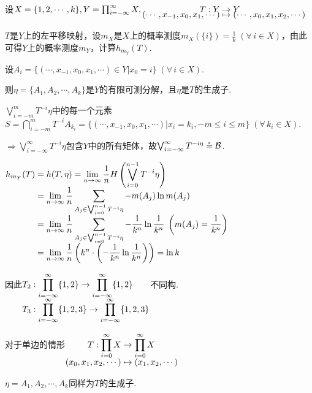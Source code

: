 \begin{instance}
    设$X=\{1,2,\cdots,k\},Y=\prod_{i=-\infty}^{\infty}{X},\setjot[-6]\begin{aligned}[t]
        T:Y&\to Y \\
        (\cdots,x_{-1},x_0,x_1,\cdots) &\mapsto (\cdots,x_0,x_1,x_2,\cdots)
    \end{aligned}$\par
    $T$是$Y$上的左平移映射，设$m_X$是$X$上的概率测度$m_X(\{i\})=\frac{1}{k}\;(\forall\, i\in X)$，由此可得$Y$上的概率测度$m_Y$，计算$h_{m_Y}(T)$.\par
    \begin{solution}
        设$A_i=\{(\cdots,x_{-1},x_0,x_1,\cdots)\in Y|x_0=i\}\;(\forall\, i\in X)$.\par
        则$\eta=\{A_1,A_2,\cdots,A_k\}$是$Y$的有限可测分解，且$\eta$是$T$的生成子.\par
        $\bigvee_{i=-m}^m{T^{-i}\eta}$中的每一个元素$S=\bigcap_{i=-m}^m{T^{-i}A_{k_i}}=\{(\cdots,x_{-1},x_0,x_1,\cdots)|x_i=k_i,-m\leq i\leq m\}\; (\forall\, k_i\in X)$.\par
        $\Rightarrow \bigvee_{i=-\infty}^\infty{T^{-i}\eta}$包含$Y$中的所有矩体，故$\bigvee_{i=-\infty}^\infty{T^{-i\eta}}\circeq\mathcal{B}$.\par
        $\setjot[-2]\begin{aligned}[t]
            h_{m_Y}(T) &= h(T,\eta) =\lim_{n\to\infty}{\frac{1}{n}H \left(\bigvee_{i=0}^{n-1}T^{-i}\eta\right)} \\
            &=\lim_{n\to\infty}{\frac{1}{n}\sum_{A_j\in\bigvee_{i=0}^{n-1}T^{-i}\eta}{-m(A_j)\ln{m(A_j)}}} \\
            &=\lim_{n\to\infty}{\frac{1}{n}\sum_{A_j\in\bigvee_{i=0}^{n-1}T^{-i}\eta}{-\frac{1}{k^n}\ln{\frac{1}{k^n}}}}\; \left(m(A_j)=\frac{1}{k^n}\right) \\
            &=\lim_{n\to\infty}{\frac{1}{n}\left(k^n\cdot \left(-\frac{1}{k^n}\ln\frac{1}{k^n}\right)\right)}=\ln{k}
        \end{aligned}$
    \end{solution}
    因此$\setjot[-2]\begin{aligned}[t]
        & T_2:\prod_{i=-\infty}^\infty\{1,2\}\to \prod_{i=-\infty}^\infty\{1,2\} \\
        &T_3:\prod_{i=-\infty}^\infty\{1,2,3\}\to\prod_{i=-\infty}^\infty\{1,2,3\}
    \end{aligned}$不同构.\par

    对于单边的情形$\setjot[-2]\begin{aligned}[t]
        T:\prod_{i=0}^\infty{X}&\to \prod_{i=0}^\infty{X} \\
        (x_0,x_1,x_2,\cdots) &\mapsto (x_1,x_2,\cdots)
    \end{aligned}$\par
    $\eta={A_1,A_2,\cdots,A_k}$同样为$T$的生成子.\par

\end{instance}



